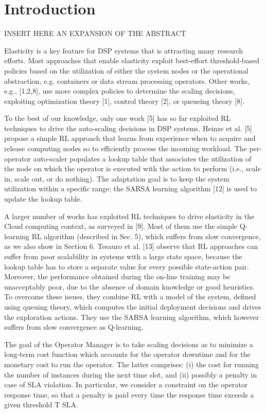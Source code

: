 \chapter{Introduction}
\label{chp:introduction}


INSERT HERE AN EXPANSION OF THE ABSTRACT


Elasticity is a key feature for DSP systems that is attracting many research efforts. 
%
Most approaches that enable elasticity exploit best-effort threshold-based policies based on the utilization of either the system nodes or the operational abstraction, e.g. containers or data stream processing operators.
%
Other works, e.g., [1,2,8], use more complex policies to determine the scaling decisions, exploiting optimization theory [1], control theory [2], or queueing theory [8].

To the best of our knowledge, only one
work [5] has so far exploited RL techniques to drive the auto-scaling decisions in
DSP systems. Heinze et al. [5] propose a simple RL approach that learns from
experience when to acquire and release computing nodes so to efficiently process
the incoming workload. The per-operator auto-scaler populates a lookup table
that associates the utilization of the node on which the operator is executed with
the action to perform (i.e., scale in, scale out, or do nothing). The adaptation
goal is to keep the system utilization within a specific range; the SARSA learning
algorithm [12] is used to update the lookup table.

A larger number of works has exploited RL techniques to drive elasticity in
the Cloud computing context, as surveyed in [9]. Most of them use the simple Q-
learning RL algorithm (described in Sec. 5), which suffers from slow convergence,
as we also show in Section 6. Tesauro et al. [13] observe that RL approaches
can suffer from poor scalability in systems with a large state space, because
the lookup table has to store a separate value for every possible state-action
pair. Moreover, the performance obtained during the on-line training may be
unacceptably poor, due to the absence of domain knowledge or good heuristics.
To overcome these issues, they combine RL with a model of the system, defined
using queuing theory, which computes the initial deployment decisions and drives
the exploration actions. They use the SARSA learning algorithm, which however
suffers from slow convergence as Q-learning.

The goal of the Operator Manager is to take scaling decisions as to minimize
a long-term cost function which accounts for the operator downtime and for the
monetary cost to run the operator. The latter comprises: (i) the cost for running
the number of instances during the next time slot, and (ii) possibly a penalty
in case of SLA violation. In particular, we consider a constraint on the operator
response time, so that a penalty is paid every time the response time exceeds a
given threshold T SLA.

